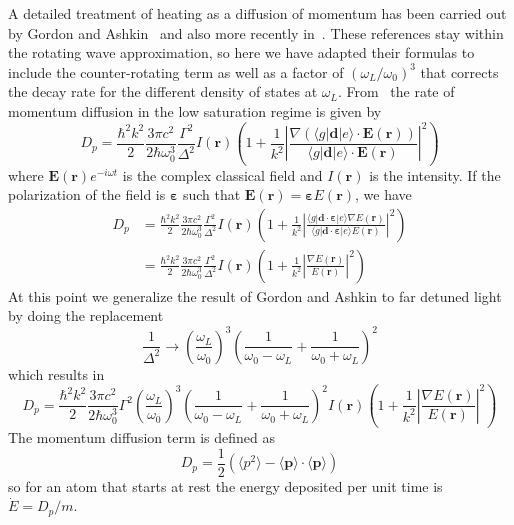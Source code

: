 \documentclass[11pt,letter]{article}
\newcommand{\bv}[1]{\ensuremath{\bm{#1}}}
\begin{document}
A detailed treatment of heating as a diffusion of momentum has been carried
out by Gordon and Ashkin~\cite{Gordon1980} and also more recently
in~\cite{Gerbier2010, Pichler2010,Riou2012}.   These references stay within
the rotating wave approximation,  so here we have adapted their formulas to
include the counter-rotating term as well as a factor of
$(\omega_{L}/\omega_{0})^{3}$ that corrects the decay rate for the different
density of states at $\omega_{L}$.  From~\cite{Gordon1980} the rate of
momentum diffusion in the low saturation regime is given by
\begin{equation}
  D_{p} = \frac{\hbar^2 k^{2}}{2}  
   \frac{3\pi c^{2}}{2\hbar\omega_{0}^{3} }  
   \frac{\Gamma^{2}}{\Delta^{2}} I(\bv{r}) 
  \left( 1 + \frac{1}{k^{2}}
    \left| \frac{\nabla( \langle g|\bv{d}|e\rangle\cdot \bv{E}(\bv{r})  )}
                { \langle g|\bv{d}|e\rangle \cdot \bv{E}(\bv{r})} 
    \right|^{2} \right) 
\end{equation}
where $\bv{E}(\bv{r})e^{-i\omega t}$ is the complex classical field and
$I(\bv{r})$ is the intensity.  If the polarization of the field is
$\bv{\varepsilon}$ such that $\bv{E}(\bv{r}) = \bv{\varepsilon} E(\bv{r})$, we
have  
\begin{equation}
\begin{split}
  D_{p} & = 
  \frac{\hbar^2 k^{2}}{2}  
   \frac{3\pi c^{2}}{2\hbar\omega_{0}^{3} }  
   \frac{\Gamma^{2}}{\Delta^{2}} I(\bv{r}) 
  \left( 1 + \frac{1}{k^{2}}
    \left| 
   \frac{ \langle g|\bv{d}\cdot\bv{\varepsilon}|e\rangle\nabla E(\bv{r}) }
        { \langle g|\bv{d}\cdot\bv{\varepsilon}|e\rangle E(\bv{r})} 
    \right|^{2} \right)  \\
&  =  
  \frac{\hbar^2 k^{2}}{2}  
   \frac{3\pi c^{2}}{2\hbar\omega_{0}^{3} }  
   \frac{\Gamma^{2}}{\Delta^{2}} I(\bv{r}) 
  \left( 1 + \frac{1}{k^{2}}
    \left| 
   \frac{ \nabla E(\bv{r}) }
        {  E(\bv{r})} 
    \right|^{2} \right) 
\end{split}
\end{equation}
At this point we generalize the result of Gordon and Ashkin to far detuned light by doing the replacement
\begin{equation}
  \frac{1}{\Delta^{2}} \rightarrow 
  \left( \frac{ \omega_{L} }{ \omega_{0} } \right)^{3}
   \left(  \frac{1}{\omega_{0}-\omega_{L}} 
    + \frac{1}{\omega_{0} + \omega_{L} } \right)^{2}
\end{equation}
which results in 
\begin{equation}
D_{p}  =  
  \frac{\hbar^2 k^{2}}{2}  
   \frac{3\pi c^{2}}{2\hbar\omega_{0}^{3} }  
   \Gamma^{2}
  \left( \frac{ \omega_{L} }{ \omega_{0} } \right)^{3}
   \left(  \frac{1}{\omega_{0}-\omega_{L}} 
    + \frac{1}{\omega_{0} + \omega_{L} } \right)^{2}
   I(\bv{r}) 
  \left( 1 + \frac{1}{k^{2}}
    \left| 
   \frac{ \nabla E(\bv{r}) }
        {  E(\bv{r})} 
    \right|^{2} \right) 
\end{equation}
The momentum diffusion term is defined as 
\begin{equation}
  D_{p} = \frac{1}{2} \left( \langle p^{2} \rangle - 
   \langle \bv{p} \rangle \cdot \langle \bv{p} \rangle \right) 
\end{equation}
so for an atom that starts at rest the energy deposited per unit time is
$\dot{E} =  D_{p}/m$.  
\end{document}
